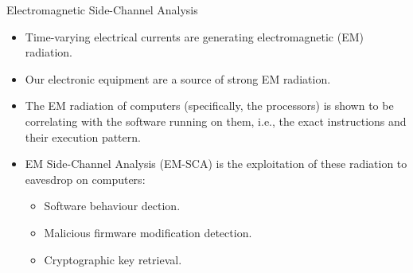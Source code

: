 \documentclass[handout]{beamer}
\begin{document}
\begin{frame}{Electromagnetic Side-Channel Analysis}  

	\begin{itemize}
	\footnotesize
	\item Time-varying electrical currents are generating electromagnetic (EM) radiation.
		\vspace{10pt}
	\item Our electronic equipment are a source of strong EM radiation.
		\vspace{10pt}
	\item The EM radiation of computers (specifically, the processors) is shown to be correlating with the software running on them, i.e., the exact instructions and their execution pattern.
		\vspace{10pt}
	\item EM Side-Channel Analysis (EM-SCA) is the exploitation of these radiation to eavesdrop on computers:
		\vspace{5pt}
		\begin{itemize}
		\footnotesize
		\item Software behaviour dection.
		\vspace{10pt}
		\item Malicious firmware modification detection.
		\vspace{10pt}
		\item Cryptographic key retrieval.
		\end{itemize}
	\end{itemize}

\end{frame}
\end{document}
